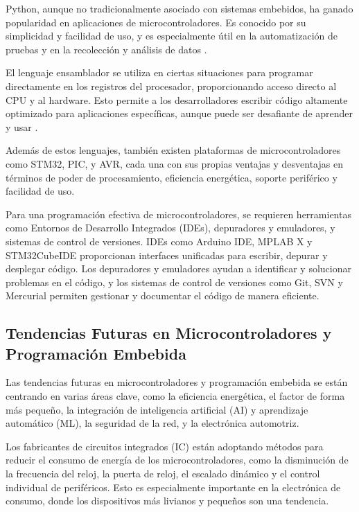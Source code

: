 Python, aunque no tradicionalmente asociado con sistemas embebidos, ha ganado popularidad en aplicaciones de microcontroladores. Es conocido por su simplicidad y facilidad de uso, y es especialmente útil en la automatización de pruebas y en la recolección y análisis de datos \cite{allaboutcircuits_microcontrollers}.

El lenguaje ensamblador se utiliza en ciertas situaciones para programar directamente en los registros del procesador, proporcionando acceso directo al CPU y al hardware. Esto permite a los desarrolladores escribir código altamente optimizado para aplicaciones específicas, aunque puede ser desafiante de aprender y usar \cite{wevolver_microcontrollers}.

Además de estos lenguajes, también existen plataformas de microcontroladores como STM32, PIC, y AVR, cada una con sus propias ventajas y desventajas en términos de poder de procesamiento, eficiencia energética, soporte periférico y facilidad de uso.

Para una programación efectiva de microcontroladores, se requieren herramientas como Entornos de Desarrollo Integrados (IDEs), depuradores y emuladores, y sistemas de control de versiones. IDEs como Arduino IDE, MPLAB X y STM32CubeIDE proporcionan interfaces unificadas para escribir, depurar y desplegar código. Los depuradores y emuladores ayudan a identificar y solucionar problemas en el código, y los sistemas de control de versiones como Git, SVN y Mercurial permiten gestionar y documentar el código de manera eficiente.

\subsection{Tendencias Futuras en Microcontroladores y Programación Embebida}

Las tendencias futuras en microcontroladores y programación embebida se están centrando en varias áreas clave, como la eficiencia energética, el factor de forma más pequeño, la integración de inteligencia artificial (AI) y aprendizaje automático (ML), la seguridad de la red, y la electrónica automotriz.

Los fabricantes de circuitos integrados (IC) están adoptando métodos para reducir el consumo de energía de los microcontroladores, como la disminución de la frecuencia del reloj, la puerta de reloj, el escalado dinámico y el control individual de periféricos. Esto es especialmente importante en la electrónica de consumo, donde los dispositivos más livianos y pequeños son una tendencia.

